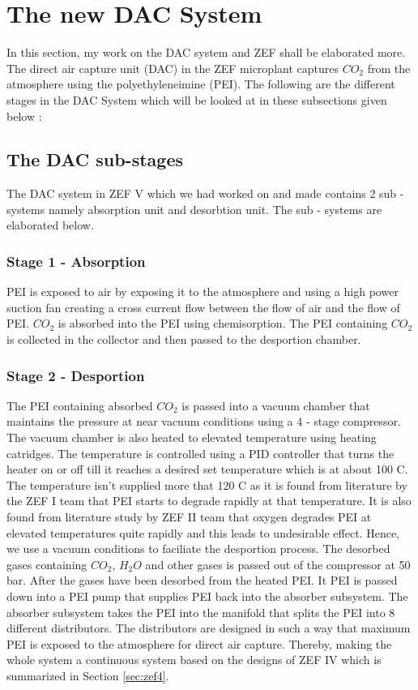 \section{The new DAC System}
\label{sec:mywork}

In this section, my work on the DAC system and ZEF shall be elaborated more. The direct air capture unit (DAC) in the ZEF microplant captures $CO_2$ from the atmosphere using the polyethyleneimine (PEI). The following are the different stages in the DAC System which will be looked at in these subsections given below :

\subsection{The DAC sub-stages}

The DAC system in ZEF V which we had worked on and made contains 2 sub - systems namely absorption unit and desorbtion unit. The sub - systems are elaborated below. 

\subsubsection{Stage 1 - Absorption}
PEI is exposed to air by exposing it to the atmosphere and using a high power suction fan creating a cross current flow between the flow of air and the flow of PEI. $CO_2$ is absorbed into the PEI using chemisorption. The PEI containing $CO_2$ is collected in the collector and then passed to the desportion chamber. 

\subsubsection{Stage 2 - Desportion}

The PEI containing absorbed $CO_2$ is passed into a vacuum chamber that maintains the pressure at near vacuum conditions using a 4 - stage compressor. The vacuum chamber is also heated to elevated temperature using heating catridges. The temperature is controlled using a PID controller that turns the heater on or off till it reaches a desired set temperature which is at about 100 \degree C. The temperature isn't supplied more that 120 \degree C as it is found from literature by the ZEF I team that PEI starts to degrade rapidly at that temperature. 
\bigbreak \noindent
It is also found from literature study by ZEF II team that oxygen degrades PEI at elevated temperatures quite rapidly and this leads to undesirable effect. Hence, we use a vacuum conditions to faciliate the desportion process. The desorbed gases containing $CO_2$, $H_2O$ and other gases is passed out of the compressor at 50 bar.
\bigbreak \noindent
After the gases have been desorbed from the heated PEI. It PEI is passed down into a PEI pump that supplies PEI back into the absorber subsystem. The absorber subsystem takes the PEI into the manifold that splits the PEI into 8 different distributors. The distributors are designed in such a way that maximum PEI is exposed to the atmosphere for direct air capture. Thereby, making the whole system a continuous system based on the designs of ZEF IV which is summarized in Section \ref{sec:zef4}.

